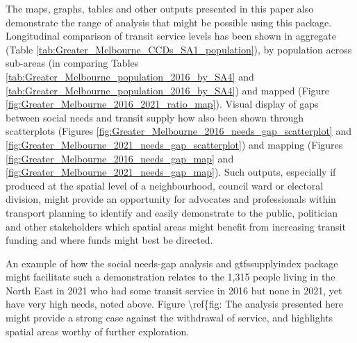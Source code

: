 \documentclass[preprint, 3p,
authoryear]{elsarticle} %
\begin{document}
The maps, graphs, tables and other outputs presented in this paper also
demonstrate the range of analysis that might be possible using this
package. Longitudinal comparison of transit service levels has been
shown in aggregate (Table
\ref{tab:Greater_Melbourne_CCDs_SA1_population}), by population across
sub-areas (in comparing Tables
\ref{tab:Greater_Melbourne_population_2016_by_SA4} and
\ref{tab:Greater_Melbourne_population_2016_by_SA4}) and mapped (Figure
\ref{fig:Greater_Melbourne_2016_2021_ratio_map}). Visual display of gaps
between social needs and transit supply how also been shown through
scatterplots (Figures
\ref{fig:Greater_Melbourne_2016_needs_gap_scatterplot} and
\ref{fig:Greater_Melbourne_2021_needs_gap_scatterplot}) and mapping
(Figures \ref{fig:Greater_Melbourne_2016_needs_gap_map} and
\ref{fig:Greater_Melbourne_2021_needs_gap_map}). Such outputs,
especially if produced at the spatial level of a neighbourhood, council
ward or electoral division, might provide an opportunity for advocates
and professionals within transport planning to identify and easily
demonstrate to the public, politician and other stakeholders which
spatial areas might benefit from increasing transit funding and where
funds might best be directed.

An example of how the social needs-gap analysis and gtfssupplyindex
package might facilitate such a demonstration relates to the 1,315
people living in the North East in 2021 who had some transit service in
2016 but none in 2021, yet have very high needs, noted above. Figure
\textbackslash ref\{fig: The analysis presented here might provide a
strong case against the withdrawal of service, and highlights spatial
areas worthy of further exploration.
\end{document}
